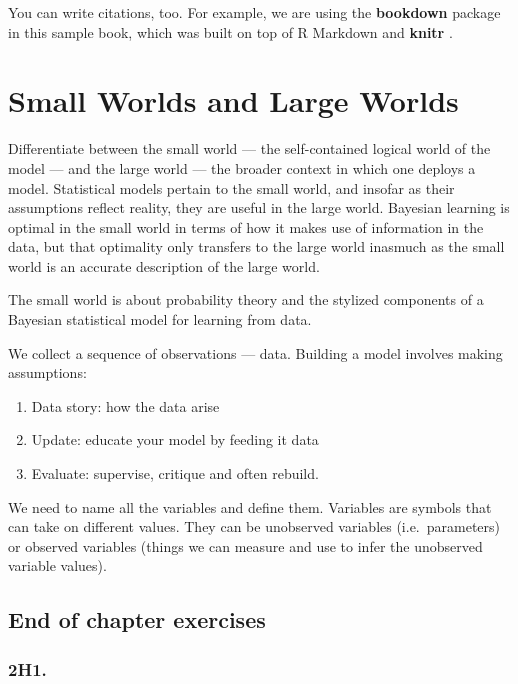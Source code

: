 \documentclass[
]{book}
\providecommand{\tightlist}{%
  \setlength{\itemsep}{0pt}\setlength{\parskip}{0pt}}
\begin{document}
You can write citations, too. For example, we are using the \textbf{bookdown} package \citep{R-bookdown} in this sample book, which was built on top of R Markdown and \textbf{knitr} \citep{xie2015}.

\hypertarget{small-worlds-and-large-worlds}{%
\chapter{Small Worlds and Large Worlds}\label{small-worlds-and-large-worlds}}

Differentiate between the small world --- the self-contained logical world of the model --- and the large world --- the broader context in which one deploys a model. Statistical models pertain to the small world, and insofar as their assumptions reflect reality, they are useful in the large world. Bayesian learning is optimal in the small world in terms of how it makes use of information in the data, but that optimality only transfers to the large world inasmuch as the small world is an accurate description of the large world.

The small world is about probability theory and the stylized components of a Bayesian statistical model for learning from data.

We collect a sequence of observations --- data. Building a model involves making assumptions:

\begin{enumerate}
\def\labelenumi{\arabic{enumi}.}
\tightlist
\item
  Data story: how the data arise
\item
  Update: educate your model by feeding it data
\item
  Evaluate: supervise, critique and often rebuild.
\end{enumerate}

We need to name all the variables and define them. Variables are symbols that can take on different values. They can be unobserved variables (i.e.~parameters) or observed variables (things we can measure and use to infer the unobserved variable values).

\hypertarget{end-of-chapter-exercises}{%
\section{End of chapter exercises}\label{end-of-chapter-exercises}}

\hypertarget{h1.}{%
\subsection{2H1.}\label{h1.}}
\end{document}
